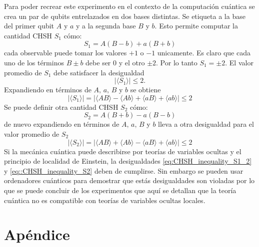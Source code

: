 \documentclass[a4paper]{article}
\begin{document}
Para poder recrear este experimento en el contexto de la computación cuántica se crea un par de qubits entrelazados en dos bases distintas. Se etiqueta a la base del primer qubit $A$ y $a$ y a la segunda base $B$ y $b$. Esto permite computar la cantidad CHSH $S_1$ cómo:
\begin{equation}
S_1=A(B-b)+a(B+b)
\end{equation} 
cada observable puede tomar los valores $+1$ o $-1$ unicamente. Es claro que cada uno de los términos $B\pm b$ debe ser $0$ y el otro $\pm 2$. Por lo tanto $S_1=\pm 2$. El valor promedio de $S_1$ debe satisfacer la desigualdad
\begin{equation}\label{eq::CHSH_inequality_S1}
|\langle S_1 \rangle|\leq 2.
\end{equation}
Expandiendo en términos de $A, \, a,\, B$ y $b$ se obtiene
\begin{equation}\label{eq:CHSH_inequality_S1_2}
|\langle S_1 \rangle|=|\langle A B\rangle-\langle A b \rangle + \langle a B \rangle + \langle a b \rangle| \leq 2
\end{equation}
Se puede definir otra cantidad CHSH $S_2$ cómo:
\begin{equation}
S_2=A(B+b)-a(B-b)
\end{equation}
de nuevo expandiendo en términos de $A, \, a,\, B$ y $b$  lleva a otra desigualdad para el valor promedio de $S_2$
\begin{equation}\label{eq::CHSH_inequality_S2}
|\langle S_2 \rangle|=|\langle A B\rangle+\langle A b \rangle - \langle a B \rangle + \langle a b \rangle| \leq 2
\end{equation}
Si la mecánica cuántica puede describirse por teorías de variables ocultas y el principio de localidad de Einstein, la desigualdades \ref{eq:CHSH_inequality_S1_2} y \ref{eq::CHSH_inequality_S2} deben de cumplirse. Sin embargo se pueden usar ordenadores cuánticos para demostrar que estás desigualdades son violadas por lo que se puede concluir de los experimentos que aquí se detallan que la teoría cuántica no es compatible con teorías de variables ocultas locales.
\section{Apéndice}\label{sec::appendix}
\end{document}
